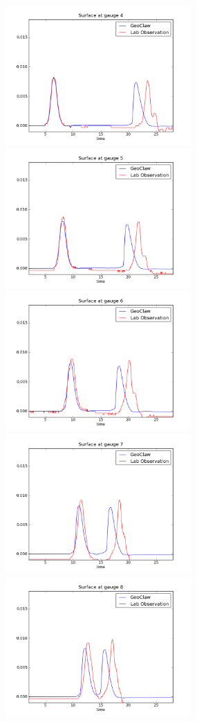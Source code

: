 \begin{figure}[ht]
\hfil\includegraphics[width=2.8in]{bp5/CaseA/gauge0004fig300.png}\hfil
\hfil\includegraphics[width=2.8in]{bp5/CaseA/gauge0005fig300.png}\hfil
\vskip 5pt
\hfil\includegraphics[width=2.8in]{bp5/CaseA/gauge0006fig300.png}\hfil
\hfil\includegraphics[width=2.8in]{bp5/CaseA/gauge0007fig300.png}\hfil
\vskip 5pt
\hfil\includegraphics[width=2.8in]{bp5/CaseA/gauge0008fig300.png}\hfil

\end{figure}

